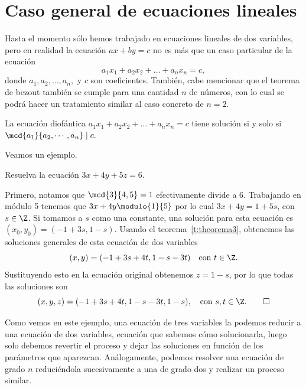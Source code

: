 \documentclass[12pt]{article}
\begin{document}
    \section{Caso general de ecuaciones lineales}

    Hasta el momento sólo hemos trabajado en ecuaciones lineales de dos variables, pero en realidad la ecuación $ax+by=c$ no es más que un caso particular de la ecuación
    \[
        a_1 x_1 + a_2 x_2 + \ldots + a_n x_n = c,
    \]
    donde $a_1, a_2, \dots, a_n,$ y $c$ son coeficientes.
    También, cabe mencionar que el teorema de bezout también se cumple para una cantidad $n$ de números, con lo cual
    se podrá hacer un tratamiento similar al caso concreto de $n = 2$.

    \begin{theorem.box}{}{}
        La ecuación diofántica $a_1 x_1 + a_2 x_2 + \ldots + a_n x_n = c$ tiene solución si y solo si $\mcd {a_1}{a_2,\cdots,a_n} \mid c.$
    \end{theorem.box}

    Veamos un ejemplo.

    \begin{example}
        Resuelva la ecuación $3x + 4y + 5z = 6$.
    \end{example}
    \begin{solution}
        Primero, notamos que $\mcd{3}{4,5} = 1$ efectivamente divide a 6.
        Trabajando en módulo 5 tenemos que $3x + 4y\modulo{1}{5}$ por lo cual $3x + 4y = 1 + 5s$, con $s \in \Z$.
        Si tomamos a $s$ como una constante, una solución para esta ecuación es $(x_0, y_0) = (-1 + 3s, 1 - s)$.
        Usando el teorema~\ref{t:theorema3}, obtenemos las soluciones generales de esta ecuación de dos variables
        \[
            (x,y) = (-1+3s+4t, 1-s-3t)\quad\text{con}\ t \in \Z.
        \]
        Sustituyendo esto en la ecuación original obtenemos $z = 1 - s$, por lo que todas las soluciones son
        \[
            (x,y,z)=(-1+3s+4t,1-s-3t,1-s), \quad \text{con}\ s,t \in \Z.\qedhere
        \]
    \end{solution}

    Como vemos en este ejemplo, una ecuación de tres variables la podemos reducir a una ecuación de dos variables,
    ecuación que sabemos cómo solucionarla, luego solo debemos revertir el proceso y dejar las soluciones en función
    de los parámetros que aparezcan.
    Análogamente, podemos resolver una ecuación de grado $n$ reduciéndola sucesivamente a una de grado dos y realizar un proceso similar.
\end{document}
